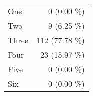 \begin{tabular}{ l  r }
One & 0 (0.00 \%)\\
Two & 9 (6.25 \%)\\
Three & 112 (77.78 \%)\\
Four & 23 (15.97 \%)\\
Five & 0 (0.00 \%)\\
Six & 0 (0.00 \%)\\
\end{tabular}